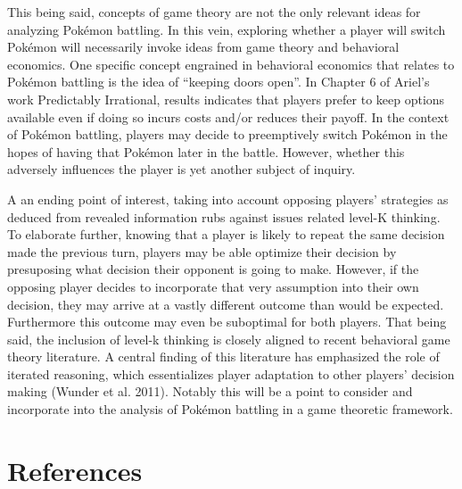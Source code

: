 \documentclass[12pt,twoside]{reedthesis}
\begin{document}
  This being said, concepts of game theory are not the only relevant ideas
  for analyzing Pokémon battling. In this vein, exploring whether a player
  will switch Pokémon will necessarily invoke ideas from game theory and
  behavioral economics. One specific concept engrained in behavioral
  economics that relates to Pokémon battling is the idea of ``keeping
  doors open''. In Chapter 6 of Ariel's work Predictably Irrational,
  results indicates that players prefer to keep options available even if
  doing so incurs costs and/or reduces their payoff. In the context of
  Pokémon battling, players may decide to preemptively switch Pokémon in
  the hopes of having that Pokémon later in the battle. However, whether
  this adversely influences the player is yet another subject of inquiry.
  
  A an ending point of interest, taking into account opposing players'
  strategies as deduced from revealed information rubs against issues
  related level-K thinking. To elaborate further, knowing that a player is
  likely to repeat the same decision made the previous turn, players may
  be able optimize their decision by presuposing what decision their
  opponent is going to make. However, if the opposing player decides to
  incorporate that very assumption into their own decision, they may
  arrive at a vastly different outcome than would be expected. Furthermore
  this outcome may even be suboptimal for both players. That being said,
  the inclusion of level-k thinking is closely aligned to recent
  behavioral game theory literature. A central finding of this literature
  has emphasized the role of iterated reasoning, which essentializes
  player adaptation to other players' decision making (Wunder et al.
  2011). Notably this will be a point to consider and incorporate into the
  analysis of Pokémon battling in a game theoretic framework.
  
  \section{References}\label{references}
  
\end{document}
